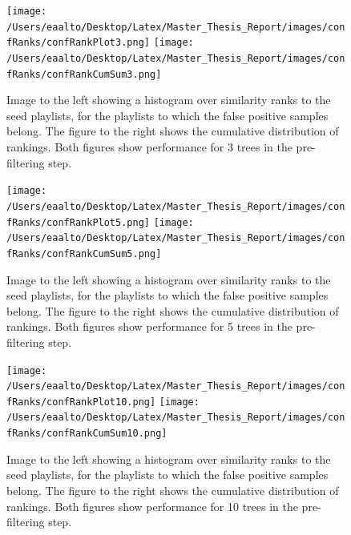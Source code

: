 \documentclass[a4paper,11pt]{kth-mag}
\begin{document}
\begin{figure}
\centering
\texttt{[image: /Users/eaalto/Desktop/Latex/Master\_Thesis\_Report/images/confRanks/confRankPlot3.png]}
\texttt{[image: /Users/eaalto/Desktop/Latex/Master\_Thesis\_Report/images/confRanks/confRankCumSum3.png]}
\caption{Image to the left showing a histogram over similarity ranks to the seed playlists, for the playlists to which the false positive samples belong. The figure to the right shows the cumulative distribution of rankings. Both figures show performance for 3 trees in the pre-filtering step.}
\end{figure}

\begin{figure}
\centering
\texttt{[image: /Users/eaalto/Desktop/Latex/Master\_Thesis\_Report/images/confRanks/confRankPlot5.png]}
\texttt{[image: /Users/eaalto/Desktop/Latex/Master\_Thesis\_Report/images/confRanks/confRankCumSum5.png]}
\caption{Image to the left showing a histogram over similarity ranks to the seed playlists, for the playlists to which the false positive samples belong. The figure to the right shows the cumulative distribution of rankings. Both figures show performance for 5 trees in the pre-filtering step.}
\end{figure}

\begin{figure}
\centering
\texttt{[image: /Users/eaalto/Desktop/Latex/Master\_Thesis\_Report/images/confRanks/confRankPlot10.png]}
\texttt{[image: /Users/eaalto/Desktop/Latex/Master\_Thesis\_Report/images/confRanks/confRankCumSum10.png]}
\caption{Image to the left showing a histogram over similarity ranks to the seed playlists, for the playlists to which the false positive samples belong. The figure to the right shows the cumulative distribution of rankings. Both figures show performance for 10 trees in the pre-filtering step.}
\end{figure}
\end{document}
